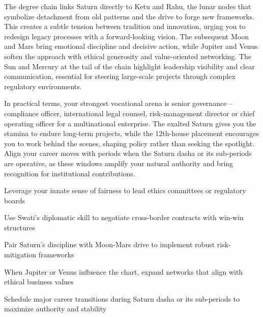 {\fontsize{9}{13}\selectfont The degree chain links Saturn directly to Ketu and Rahu, the lunar nodes that symbolize detachment from old patterns and the drive to forge new frameworks. This creates a subtle tension between tradition and innovation, urging you to redesign legacy processes with a forward-looking vision. The subsequent Moon and Mars bring emotional discipline and decisive action, while Jupiter and Venus soften the approach with ethical generosity and value-oriented networking. The Sun and Mercury at the tail of the chain highlight leadership visibility and clear communication, essential for steering large-scale projects through complex regulatory environments.}\par\vspace{1.8mm}

{\fontsize{9}{13}\selectfont In practical terms, your strongest vocational arena is senior governance -- compliance officer, international legal counsel, risk-management director or chief operating officer for a multinational enterprise. The exalted Saturn gives you the stamina to endure long-term projects, while the 12th-house placement encourages you to work behind the scenes, shaping policy rather than seeking the spotlight. Align your career moves with periods when the Saturn dasha or its sub-periods are operative, as these windows amplify your natural authority and bring recognition for institutional contributions.}\par\vspace{1.8mm}

\begin{diamondlist}
  \item {\fontsize{8.5}{12}\selectfont Leverage your innate sense of fairness to lead ethics committees or regulatory boards}
  \item {\fontsize{8.5}{12}\selectfont Use Swati's diplomatic skill to negotiate cross-border contracts with win-win structures}
  \item {\fontsize{8.5}{12}\selectfont Pair Saturn's discipline with Moon-Mars drive to implement robust risk-mitigation frameworks}
  \item {\fontsize{8.5}{12}\selectfont When Jupiter or Venus influence the chart, expand networks that align with ethical business values}
  \item {\fontsize{8.5}{12}\selectfont Schedule major career transitions during Saturn dasha or its sub-periods to maximize authority and stability}
\end{diamondlist}

